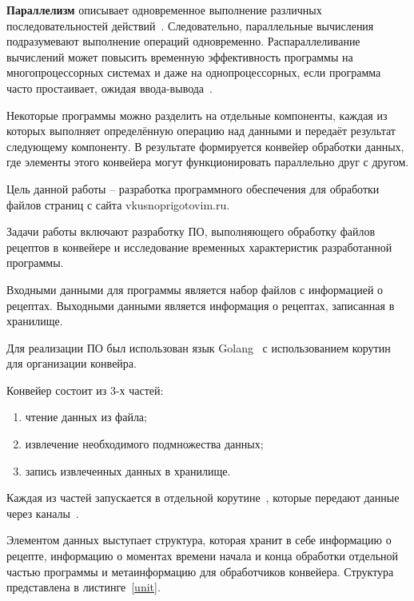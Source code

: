 

\textbf{Параллелизм} описывает одновременное выполнение различных последовательностей действий~\cite{posix-threads}. Следовательно, параллельные вычисления подразумевают выполнение операций одновременно. Распараллеливание вычислений может повысить временную эффективность программы на многопроцессорных системах и даже на однопроцессорных, если программа часто простаивает, ожидая ввода-вывода~\cite{tanenbaum}.

Некоторые программы можно разделить на отдельные компоненты, каждая из которых выполняет определённую операцию над данными и передаёт результат следующему компоненту. В результате формируется конвейер обработки данных, где элементы этого конвейера могут функционировать параллельно друг с другом.

Цель данной работы -- разработка программного обеспечения для обработки файлов страниц с сайта vkusnoprigotovim.ru.

Задачи работы включают разработку ПО, выполняющего обработку файлов рецептов в конвейере и исследование временных характеристик разработанной программы.

\clearpage
{}

Входными данными для программы является набор файлов с информацией о рецептах.
Выходными данными является информация о рецептах, записанная в хранилище.

\clearpage
{}

Для реализации ПО был использован язык Golang~\cite{go} с использованием корутин для организации конвейра.

Конвейер состоит из 3-х частей:

\begin{enumerate}
	\item чтение данных из файла;
	\item извлечение необходимого подмножества данных;
	\item запись извлеченных данных в хранилище.
\end{enumerate}

Каждая из частей запускается в отдельной корутине~\cite{go-mem}, которые передают данные через каналы~\cite{go-mem}.

Элементом данных выступает структура, которая хранит в себе информацию о рецепте, информацию о моментах времени начала и конца обработки отдельной частью программы и метаинформацию для обработчиков конвейера. Структура представлена в листинге~\ref{unit}.


